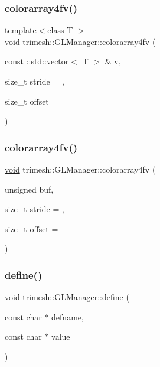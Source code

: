 \subsubsection{\texorpdfstring{colorarray4fv()}{colorarray4fv()}\hspace{0.1cm}{\footnotesize\ttfamily [2/3]}}
{\footnotesize\ttfamily template$<$class T $>$ \\
\hyperlink{namespacetrimesh_a784ddfd979e1c579bda795a8edfc3f43}{void} trimesh\+::\+G\+L\+Manager\+::colorarray4fv (\begin{DoxyParamCaption}\item[{const \+::std\+::vector$<$ T $>$ \&}]{v,  }\item[{size\+\_\+t}]{stride = {},  }\item[{size\+\_\+t}]{offset = {} }\end{DoxyParamCaption})\hspace{0.3cm}{\ttfamily [inline]}}

\mbox{\label{classtrimesh_1_1GLManager_afb6e752e605f644da918716d36c468ba}} 
\subsubsection{\texorpdfstring{colorarray4fv()}{colorarray4fv()}\hspace{0.1cm}{\footnotesize\ttfamily [3/3]}}
{\footnotesize\ttfamily \hyperlink{namespacetrimesh_a784ddfd979e1c579bda795a8edfc3f43}{void} trimesh\+::\+G\+L\+Manager\+::colorarray4fv (\begin{DoxyParamCaption}\item[{unsigned}]{buf,  }\item[{size\+\_\+t}]{stride = {},  }\item[{size\+\_\+t}]{offset = {} }\end{DoxyParamCaption})}

\mbox{\label{classtrimesh_1_1GLManager_aadb5cf05653eb16a06f662265ee86ad3}} 
\subsubsection{\texorpdfstring{define()}{define()}}
{\footnotesize\ttfamily \hyperlink{namespacetrimesh_a784ddfd979e1c579bda795a8edfc3f43}{void} trimesh\+::\+G\+L\+Manager\+::define (\begin{DoxyParamCaption}\item[{const char $\ast$}]{defname,  }\item[{const char $\ast$}]{value }\end{DoxyParamCaption})}


